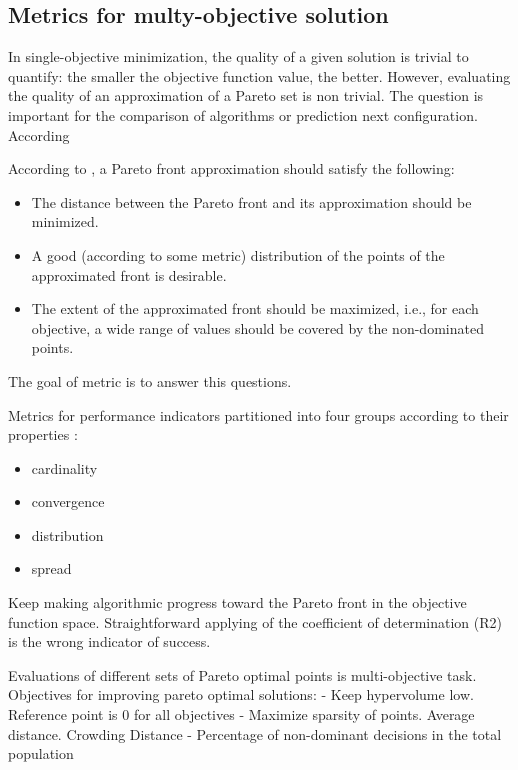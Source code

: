        \subsection{Metrics for multy-objective solution}
            In single-objective minimization, the quality of a given solution is trivial to quantify:
            the smaller the objective function value, the better. However, evaluating the quality of an approximation of a Pareto set is non trivial.
            The question is important for the comparison of algorithms or prediction next configuration. According

            According to \cite{ZitzlerDT00}, a Pareto front approximation should satisfy the following:
            \begin{itemize}
                \item The distance between the Pareto front and its approximation should be minimized.
                \item A good (according to some metric) distribution of the points of the approximated front is desirable.
                \item The extent of the approximated front should be maximized, i.e., for each objective, a wide range of values should be covered by the non-dominated points.
            \end{itemize}

            The goal of metric is to answer this questions.  

            Metrics for performance indicators partitioned into four groups according to their properties \cite{Audet2018PerformanceII}: 
            \begin{itemize}
                \item cardinality
                \item convergence
                \item distribution
                \item spread
            \end{itemize}
        
            Keep making algorithmic progress toward the Pareto front in the objective function space.
            Straightforward applying of the coefficient of determination (R2) is the wrong indicator of success. 
        
            Evaluations of different sets of Pareto optimal points is multi-objective task.
            Objectives for improving pareto optimal solutions:
            - Keep hypervolume low. Reference point is 0 for all objectives
            - Maximize sparsity of points. Average distance. Crowding Distance
            - Percentage of non-dominant decisions in the total population
        
